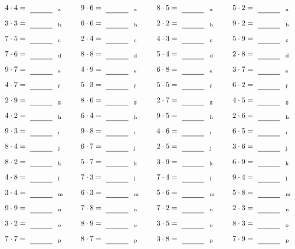 \documentclass
[
  draft    = true,
  fontsize = 11pt,
  parskip  = half-
]
{scrartcl}
\begin{document}
\par\vfill\par
\begin{align*}
    \pline{4\cdot4}&=\rline{a}
  & \pline{9\cdot6}&=\rline{a}
  & \pline{8\cdot5}&=\rline{a}
  & \pline{5\cdot2}&=\rline{a} \\[1ex]
    \pline{3\cdot3}&=\rline{b}
  & \pline{6\cdot6}&=\rline{b}
  & \pline{2\cdot2}&=\rline{b}
  & \pline{9\cdot2}&=\rline{b} \\[1ex]
    \pline{7\cdot5}&=\rline{c}
  & \pline{2\cdot4}&=\rline{c}
  & \pline{4\cdot3}&=\rline{c}
  & \pline{5\cdot9}&=\rline{c} \\[1ex]
    \pline{7\cdot6}&=\rline{d}
  & \pline{8\cdot8}&=\rline{d}
  & \pline{5\cdot4}&=\rline{d}
  & \pline{2\cdot8}&=\rline{d} \\[1ex]
    \pline{9\cdot7}&=\rline{e}
  & \pline{4\cdot9}&=\rline{e}
  & \pline{6\cdot8}&=\rline{e}
  & \pline{3\cdot7}&=\rline{e} \\[1ex]
    \pline{4\cdot7}&=\rline{f}
  & \pline{5\cdot3}&=\rline{f}
  & \pline{5\cdot5}&=\rline{f}
  & \pline{6\cdot2}&=\rline{f} \\[1ex]
    \pline{2\cdot9}&=\rline{g}
  & \pline{8\cdot6}&=\rline{g}
  & \pline{2\cdot7}&=\rline{g}
  & \pline{4\cdot5}&=\rline{g} \\[1ex]
    \pline{4\cdot2}&=\rline{h}
  & \pline{6\cdot4}&=\rline{h}
  & \pline{9\cdot5}&=\rline{h}
  & \pline{2\cdot6}&=\rline{h} \\[1ex]
    \pline{9\cdot3}&=\rline{i}
  & \pline{9\cdot8}&=\rline{i}
  & \pline{4\cdot6}&=\rline{i}
  & \pline{6\cdot5}&=\rline{i} \\[1ex]
    \pline{8\cdot4}&=\rline{j}
  & \pline{6\cdot7}&=\rline{j}
  & \pline{2\cdot5}&=\rline{j}
  & \pline{3\cdot6}&=\rline{j} \\[1ex]
    \pline{8\cdot2}&=\rline{k}
  & \pline{5\cdot7}&=\rline{k}
  & \pline{3\cdot9}&=\rline{k}
  & \pline{6\cdot9}&=\rline{k} \\[1ex]
    \pline{4\cdot8}&=\rline{l}
  & \pline{7\cdot3}&=\rline{l}
  & \pline{7\cdot4}&=\rline{l}
  & \pline{9\cdot4}&=\rline{l} \\[1ex]
    \pline{3\cdot4}&=\rline{m}
  & \pline{6\cdot3}&=\rline{m}
  & \pline{5\cdot6}&=\rline{m}
  & \pline{5\cdot8}&=\rline{m} \\[1ex]
    \pline{9\cdot9}&=\rline{n}
  & \pline{7\cdot8}&=\rline{n}
  & \pline{7\cdot2}&=\rline{n}
  & \pline{2\cdot3}&=\rline{n} \\[1ex]
    \pline{3\cdot2}&=\rline{o}
  & \pline{8\cdot9}&=\rline{o}
  & \pline{3\cdot5}&=\rline{o}
  & \pline{8\cdot3}&=\rline{o} \\[1ex]
    \pline{7\cdot7}&=\rline{p}
  & \pline{8\cdot7}&=\rline{p}
  & \pline{3\cdot8}&=\rline{p}
  & \pline{7\cdot9}&=\rline{p}
\end{align*}
\end{document}
